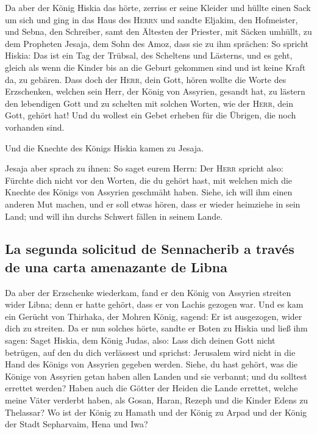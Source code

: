  Da aber der König Hiskia das hörte, zerriss er seine
Kleider und hüllte einen Sack um sich und ging in das Haus des
\textsc{Herrn}  und sandte Eljakim, den Hofmeister, und
Sebna, den Schreiber, samt den Ältesten der Priester, mit Säcken
umhüllt, zu dem Propheten Jesaja, dem Sohn des Amoz,  dass
sie zu ihm sprächen: So spricht Hiskia: Das ist ein Tag der Trübsal, des
Scheltens und Lästerns, und es geht, gleich als wenn die Kinder bis an
die Geburt gekommen sind und ist keine Kraft da, zu gebären.
 Dass doch der \textsc{Herr}, dein Gott, hören wollte die
Worte des Erzschenken, welchen sein Herr, der König von Assyrien,
gesandt hat, zu lästern den lebendigen Gott und zu schelten mit solchen
Worten, wie der \textsc{Herr}, dein Gott, gehört hat! Und du wollest ein
Gebet erheben für die Übrigen, die noch vorhanden sind.

 Und die Knechte des Königs Hiskia kamen zu Jesaja.

 Jesaja aber sprach zu ihnen: So saget eurem Herrn: Der
\textsc{Herr} spricht also: Fürchte dich nicht vor den Worten, die du
gehört hast, mit welchen mich die Knechte des Königs von Assyrien
geschmäht haben.  Siehe, ich will ihm einen anderen Mut
machen, und er soll etwas hören, dass er wieder heimziehe in sein Land;
und will ihn durchs Schwert fällen in seinem Lande.

\hypertarget{la-segunda-solicitud-de-sennacherib-a-travuxe9s-de-una-carta-amenazante-de-libna}{%
\subsection{La segunda solicitud de Sennacherib a través de una carta
amenazante de
Libna}\label{la-segunda-solicitud-de-sennacherib-a-travuxe9s-de-una-carta-amenazante-de-libna}}

 Da aber der Erzschenke wiederkam, fand er den König von
Assyrien streiten wider Libna; denn er hatte gehört, dass er von Lachis
gezogen war.  Und es kam ein Gerücht von Thirhaka, der
Mohren König, sagend: Er ist ausgezogen, wider dich zu streiten.
 Da er nun solches hörte, sandte er Boten zu Hiskia und
ließ ihm sagen: Saget Hiskia, dem König Judas, also: Lass dich deinen
Gott nicht betrügen, auf den du dich verlässest und sprichst: Jerusalem
wird nicht in die Hand des Königs von Assyrien gegeben werden.
 Siehe, du hast gehört, was die Könige von Assyrien getan
haben allen Landen und sie verbannt; und du solltest errettet werden?
 Haben auch die Götter der Heiden die Lande errettet,
welche meine Väter verderbt haben, als Gosan, Haran, Rezeph und die
Kinder Edens zu Thelassar?  Wo ist der König zu Hamath
und der König zu Arpad und der König der Stadt Sepharvaim, Hena und Iwa?


